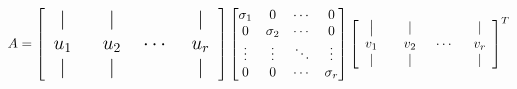\documentclass[a4paper,11pt,DIV=15]{scrartcl} %
\theoremstyle{plain}
\theoremstyle{definition}
\begin{document}
\begin{equation}
    A = 
\Large
\begin{bmatrix}
    \phantom{-} \vert \phantom{-} & \phantom{-} \vert \phantom{-} & & \phantom{-} \vert \phantom{-} \\
    u_1 & u_2 & \cdots & u_r \\
    \phantom{-} \vert \phantom{-} & \phantom{-} \vert \phantom{-} & & \phantom{-} \vert \phantom{-} \\
\end{bmatrix}
\normalsize
\begin{bmatrix}
    \sigma_1 & 0 & \cdots & 0 \\
    0 & \sigma_2 & \cdots & 0 \\
    \vdots & \vdots & \ddots & \vdots \\
    0 & 0 & \cdots & \sigma_r
\end{bmatrix}
\begin{bmatrix}
    \phantom{-} \big\lvert \phantom{-} & \phantom{-} \vert \phantom{-} & & \phantom{-} \vert \phantom{-} \\
    v_1 & v_2 & \cdots & v_r \\
    \phantom{-} \vert \phantom{-} & \phantom{-} \vert \phantom{-} & & \phantom{-} \vert \phantom{-} \\
\end{bmatrix}^T
\label{eq:matrixA}
\end{equation}
\end{document}
